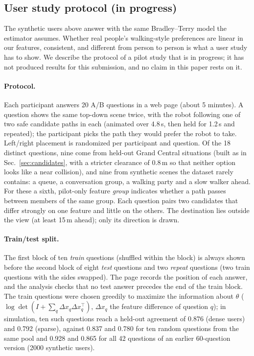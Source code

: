 

\subsection{User study protocol (in progress)}
\label{sec:pilot}

The synthetic users above answer with the same Bradley--Terry model the estimator assumes. Whether real people's walking-style
preferences are linear in our features, consistent, and different from person to person is what a user study has to show. We describe
the protocol of a pilot study that is in progress; it has not produced results for this submission, and no claim in this paper rests on it.

\paragraph{Protocol.}
Each participant answers 20 A/B questions in a web page (about 5 minutes). A question shows the same top-down scene twice, with the
robot following one of two safe candidate paths in each (animated over 4.8\,s, then held for 1.2\,s and repeated); the participant picks
the path they would prefer the robot to take. Left/right placement is randomized per participant and question. Of the 18 distinct questions, nine come
from held-out Grand Central situations (built as in Sec.~\ref{sec:candidates}, with a stricter clearance of 0.8\,m so that neither option
looks like a near collision), and nine from synthetic scenes the dataset rarely contains: a queue, a conversation group, a walking party
and a slow walker ahead. For these a sixth, pilot-only feature \emph{group} indicates whether a path passes between members of the same
group. Each question pairs two candidates that differ strongly on one feature and little on the others. The destination lies outside the
view (at least 15\,m ahead); only its direction is drawn.

\paragraph{Train/test split.}
The first block of ten \emph{train} questions (shuffled within the block) is always shown before the second block of eight \emph{test}
questions and two \emph{repeat} questions (two train questions with the sides swapped). The page records the position of each answer,
and the analysis checks that no test answer precedes the end of the train block. The train questions were chosen greedily to maximize
the information about $\theta$ ($\log\det(I + \sum_q \Delta x_q \Delta x_q^\top)$, $\Delta x_q$ the feature difference of question $q$);
in simulation, ten such questions reach a held-out agreement of 0.876 (dense users) and 0.792 (sparse), against 0.837 and 0.780 for ten
random questions from the same pool and 0.928 and 0.865 for all 42 questions of an earlier 60-question version (2000 synthetic users).

